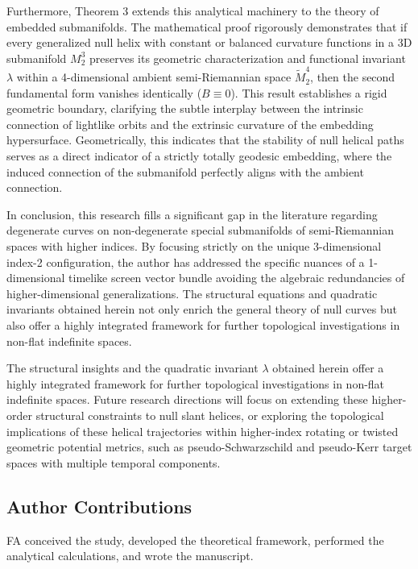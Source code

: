 \documentclass [reqno]{amsart}
\theoremstyle{plain}
\numberwithin{equation}{section}
\begin{document}
Furthermore, Theorem 3 extends this analytical machinery to the theory of embedded submanifolds. The mathematical proof rigorously demonstrates that if every generalized null helix with constant or balanced curvature functions in a 3D submanifold $M_2^3$ preserves its geometric characterization and functional invariant $\lambda$ within a 4-dimensional ambient semi-Riemannian space $\tilde{M}_2^4$, then the second fundamental form vanishes identically ($B\equiv 0$). This result establishes a rigid geometric boundary, clarifying the subtle interplay between the intrinsic connection of lightlike orbits and the extrinsic curvature of the embedding hypersurface. Geometrically, this indicates that the stability of null helical paths serves as a direct indicator of a strictly totally geodesic embedding, where the induced connection of the submanifold perfectly aligns with the ambient connection.

In conclusion, this research fills a significant gap in the literature regarding degenerate curves on non-degenerate special submanifolds of semi-Riemannian spaces with higher indices. By focusing strictly on the unique 3-dimensional index-2 configuration, the author has addressed the specific nuances of a 1-dimensional timelike screen vector bundle avoiding the algebraic redundancies of higher-dimensional generalizations. The structural equations and quadratic invariants obtained herein not only enrich the general theory of null curves but also offer a highly integrated framework for further topological investigations in non-flat indefinite spaces. 

The structural insights and the quadratic invariant $\lambda$ obtained herein offer a highly integrated framework for further topological investigations in non-flat indefinite spaces. Future research directions will focus on extending these higher-order structural constraints to null slant helices, or exploring the topological implications of these helical trajectories within higher-index rotating or twisted geometric potential metrics, such as pseudo-Schwarzschild and pseudo-Kerr target spaces with multiple temporal components.



\subsection*{Author Contributions}
FA conceived the study, developed the theoretical framework, performed the analytical calculations, and wrote the manuscript.
\end{document}
